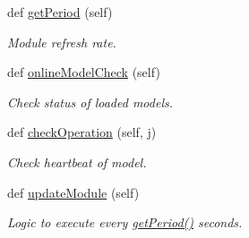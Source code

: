 \begin{DoxyCompactItemize}
def \hyperlink{group__icubclient__SAM__Core_a359693de09f891957293074941a5a254}{get\+Period} (self)
\begin{DoxyCompactList}\small\item\em Module refresh rate. \end{DoxyCompactList}\item 
def \hyperlink{group__icubclient__SAM__Core_a6d4be201af180a4de3489d2602419ec6}{online\+Model\+Check} (self)
\begin{DoxyCompactList}\small\item\em Check status of loaded models. \end{DoxyCompactList}\item 
def \hyperlink{group__icubclient__SAM__Core_afa870a7224aaf0b8fb41ccb7ffbf53c0}{check\+Operation} (self, j)
\begin{DoxyCompactList}\small\item\em Check heartbeat of model. \end{DoxyCompactList}\item 
def \hyperlink{group__icubclient__SAM__Core_a7a8e2239caf5d90438716dd1c7f65055}{update\+Module} (self)
\begin{DoxyCompactList}\small\item\em Logic to execute every \hyperlink{group__icubclient__SAM__Core_a359693de09f891957293074941a5a254}{get\+Period()} seconds. \end{DoxyCompactList}\end{DoxyCompactItemize}
